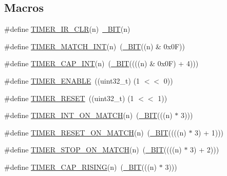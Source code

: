 \subsection*{Macros}
\begin{DoxyCompactItemize}
\item 
\#define \hyperlink{group___t_i_m_e_r__18_x_x__43_x_x_ga7c74d9b89f53a497dd1128e2f4b2670b}{T\+I\+M\+E\+R\+\_\+\+I\+R\+\_\+\+C\+LR}(n)~\hyperlink{group___l_p_c___types___public___macros_ga7ee022f5e5a971a8324e4b7572d49170}{\+\_\+\+B\+IT}(n)
\item 
\#define \hyperlink{group___t_i_m_e_r__18_x_x__43_x_x_ga1f2ad401455a401aa8400fd343eadd1a}{T\+I\+M\+E\+R\+\_\+\+M\+A\+T\+C\+H\+\_\+\+I\+NT}(n)~(\hyperlink{group___l_p_c___types___public___macros_ga7ee022f5e5a971a8324e4b7572d49170}{\+\_\+\+B\+IT}((n) \& 0x0\+F))
\item 
\#define \hyperlink{group___t_i_m_e_r__18_x_x__43_x_x_ga085de5b6eb6d51b2ef555bd06f267f83}{T\+I\+M\+E\+R\+\_\+\+C\+A\+P\+\_\+\+I\+NT}(n)~(\hyperlink{group___l_p_c___types___public___macros_ga7ee022f5e5a971a8324e4b7572d49170}{\+\_\+\+B\+IT}((((n) \& 0x0\+F) + 4)))
\item 
\#define \hyperlink{group___t_i_m_e_r__18_x_x__43_x_x_gace9bc6168bdb15fd3c88da899ad3f154}{T\+I\+M\+E\+R\+\_\+\+E\+N\+A\+B\+LE}~((uint32\+\_\+t) (1 $<$$<$ 0))
\item 
\#define \hyperlink{group___t_i_m_e_r__18_x_x__43_x_x_ga892a0fbd1ea794e5c6dbbc66e9703bd6}{T\+I\+M\+E\+R\+\_\+\+R\+E\+S\+ET}~((uint32\+\_\+t) (1 $<$$<$ 1))
\item 
\#define \hyperlink{group___t_i_m_e_r__18_x_x__43_x_x_ga7fd49e94768d8d2016f72965f904f5e1}{T\+I\+M\+E\+R\+\_\+\+I\+N\+T\+\_\+\+O\+N\+\_\+\+M\+A\+T\+CH}(n)~(\hyperlink{group___l_p_c___types___public___macros_ga7ee022f5e5a971a8324e4b7572d49170}{\+\_\+\+B\+IT}(((n) $\ast$ 3)))
\item 
\#define \hyperlink{group___t_i_m_e_r__18_x_x__43_x_x_ga0d69103df0ceea6cb41286bc8e7536b3}{T\+I\+M\+E\+R\+\_\+\+R\+E\+S\+E\+T\+\_\+\+O\+N\+\_\+\+M\+A\+T\+CH}(n)~(\hyperlink{group___l_p_c___types___public___macros_ga7ee022f5e5a971a8324e4b7572d49170}{\+\_\+\+B\+IT}((((n) $\ast$ 3) + 1)))
\item 
\#define \hyperlink{group___t_i_m_e_r__18_x_x__43_x_x_ga7362986ae8e43df0e575eba1789722f4}{T\+I\+M\+E\+R\+\_\+\+S\+T\+O\+P\+\_\+\+O\+N\+\_\+\+M\+A\+T\+CH}(n)~(\hyperlink{group___l_p_c___types___public___macros_ga7ee022f5e5a971a8324e4b7572d49170}{\+\_\+\+B\+IT}((((n) $\ast$ 3) + 2)))
\item 
\#define \hyperlink{group___t_i_m_e_r__18_x_x__43_x_x_ga34ab45ae29494cf8f92fdc4e6eb7bb06}{T\+I\+M\+E\+R\+\_\+\+C\+A\+P\+\_\+\+R\+I\+S\+I\+NG}(n)~(\hyperlink{group___l_p_c___types___public___macros_ga7ee022f5e5a971a8324e4b7572d49170}{\+\_\+\+B\+IT}(((n) $\ast$ 3)))

\end{DoxyCompactItemize}
